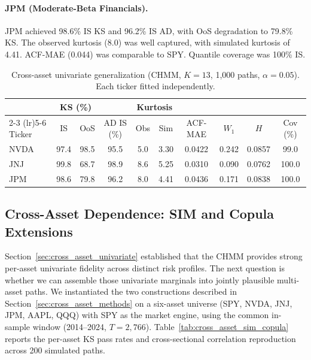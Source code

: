 \paragraph{JPM (Moderate-Beta Financials).}
JPM achieved 98.6\% IS KS and 96.2\% IS AD, with OoS degradation to 79.8\% KS.
The observed kurtosis (8.0) was well captured, with simulated kurtosis of 4.41.
ACF-MAE (0.044) was comparable to SPY.
Quantile coverage was 100\% IS.

\begin{table}[t]
\centering
\caption{Cross-asset univariate generalization (CHMM, $K = 13$, 1{,}000 paths, $\alpha = 0.05$). Each ticker fitted independently.}
\label{tab:cross_asset}
\small
\begin{tabular}{l cc c cc c c c c}
\toprule
& \multicolumn{2}{c}{KS (\%)} & & \multicolumn{2}{c}{Kurtosis} & & & & \\
\cmidrule(lr){2-3} \cmidrule(lr){5-6}
Ticker & IS & OoS & AD IS (\%) & Obs & Sim & ACF-MAE & $W_1$ & $H$ & Cov (\%) \\
\midrule
NVDA & 97.4 & 98.5 & 95.5 & 5.0 & 3.30 & 0.0422 & 0.242 & 0.0857 & 99.0 \\
JNJ  & 99.8 & 68.7 & 98.9 & 8.6 & 5.25 & 0.0310 & 0.090 & 0.0762 & 100.0 \\
JPM  & 98.6 & 79.8 & 96.2 & 8.0 & 4.41 & 0.0436 & 0.171 & 0.0838 & 100.0 \\
\bottomrule
\end{tabular}
\end{table}

\subsection{Cross-Asset Dependence: SIM and Copula Extensions}
\label{sec:cross_asset}

Section~\ref{sec:cross_asset_univariate} established that the CHMM provides strong per-asset univariate fidelity across distinct risk profiles.
The next question is whether we can assemble those univariate marginals into jointly plausible multi-asset paths.
We instantiated the two constructions described in Section~\ref{sec:cross_asset_methods} on a six-asset universe (SPY, NVDA, JNJ, JPM, AAPL, QQQ) with SPY as the market engine, using the common in-sample window (2014--2024, $T = 2{,}766$).
Table~\ref{tab:cross_asset_sim_copula} reports the per-asset KS pass rates and cross-sectional correlation reproduction across 200 simulated paths.

